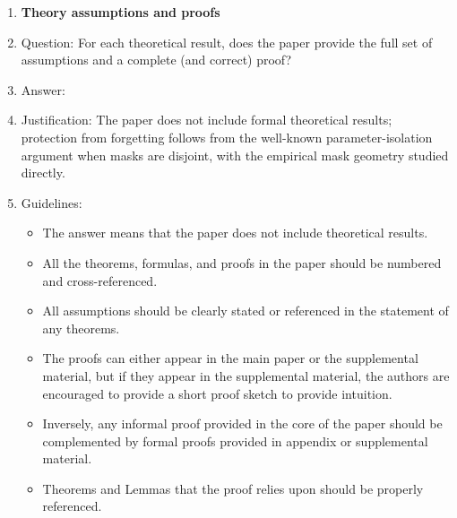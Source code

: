 \begin{enumerate}
\begin{itemize}
        \item If applicable, the authors should discuss possible limitations of their approach to address problems of privacy and fairness.
        \item While the authors might fear that complete honesty about limitations might be used by reviewers as grounds for rejection, a worse outcome might be that reviewers discover limitations that aren't acknowledged in the paper. The authors should use their best judgment and recognize that individual actions in favor of transparency play an important role in developing norms that preserve the integrity of the community. Reviewers will be specifically instructed to not penalize honesty concerning limitations.
    \end{itemize}

\item {\bf Theory assumptions and proofs}
    \item[] Question: For each theoretical result, does the paper provide the full set of assumptions and a complete (and correct) proof?
    \item[] Answer: \answerNA{}
    \item[] Justification: The paper does not include formal theoretical results; protection from forgetting follows from the well-known parameter-isolation argument when masks are disjoint, with the empirical mask geometry studied directly.
    \item[] Guidelines:
    \begin{itemize}
        \item The answer \answerNA{} means that the paper does not include theoretical results.
        \item All the theorems, formulas, and proofs in the paper should be numbered and cross-referenced.
        \item All assumptions should be clearly stated or referenced in the statement of any theorems.
        \item The proofs can either appear in the main paper or the supplemental material, but if they appear in the supplemental material, the authors are encouraged to provide a short proof sketch to provide intuition.
        \item Inversely, any informal proof provided in the core of the paper should be complemented by formal proofs provided in appendix or supplemental material.
        \item Theorems and Lemmas that the proof relies upon should be properly referenced.
    \end{itemize}


\end{enumerate}
